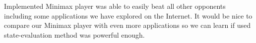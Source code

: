 \documentclass[paper=a4, fontsize=11pt]{article} %
\begin{document}
Implemented Minimax player was able to easily beat all other opponents including some applications we have explored on the Internet. It would be nice to compare our Minimax player with even more applications so we can learn if used state-evaluation method was powerful enough.

\begin{flushleft}
%
\end{flushleft}
\end{document}
